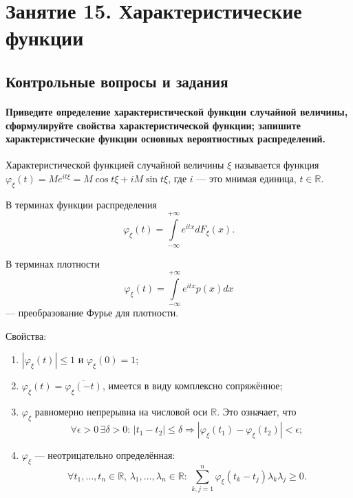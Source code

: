 \chapter*{Занятие 15. Характеристические функции}

\section*{Контрольные вопросы и задания}

\subsubsection*{Приведите определение характеристической функции случайной величины, сформулируйте свойства характеристической функции; запишите характеристические функции основных вероятностных распределений.}

Характеристической функцией случайной величины $ \xi $ называется функция $ \varphi_{ \xi } \left( t \right) = Me^{it \xi } = M \cos t \xi + iM \sin t \xi $, где $i$ ---
это мнимая единица, $t \in \mathbb{R}$.

В терминах функции распределения
$$ \varphi_{ \xi } \left( t \right) =
\int \limits_{- \infty }^{+ \infty } e^{itx} dF_{ \xi } \left( x \right).$$

В терминах плотности
$$ \varphi_{ \xi } \left( t \right) =
\int \limits_{- \infty }^{+ \infty } e^{itx} p \left( x \right) dx$$
--- преобразование Фурье для плотности.

Свойства:
\begin{enumerate}
\item $ \left| \varphi_{ \xi } \left( t \right) \right| \leq 1$ и $ \varphi_{ \xi } \left( 0 \right) = 1$;
\item $ \varphi_{ \xi } \left( t \right) = \overline{ \varphi_{ \xi } \left( -t \right)}$, имеется в виду комплексно сопряжённое;
\item $ \varphi_{ \xi }$ равномерно непрерывна на числовой оси $ \mathbb{R}$.
Это означает,
что
$$ \forall \epsilon > 0 \,
\exists \delta > 0: \,
\left| t_1 - t_2 \right| \leq \delta \Rightarrow \left| \varphi_{ \xi } \left( t_1 \right) - \varphi_{ \xi } \left( t_2 \right) \right| < \epsilon;$$
\item $ \varphi_{ \xi }$ --- неотрицательно определённая:
$$ \forall t_1, \dotsc, t_n \in \mathbb{R}, \,
\lambda_1, \dotsc, \lambda_n \in \mathbb{R}: \,
\sum \limits_{k,j=1}^n \varphi_{ \xi } \left( t_k - t_j \right) \lambda_k \lambda_j \geq 0.$$
\end{enumerate}

